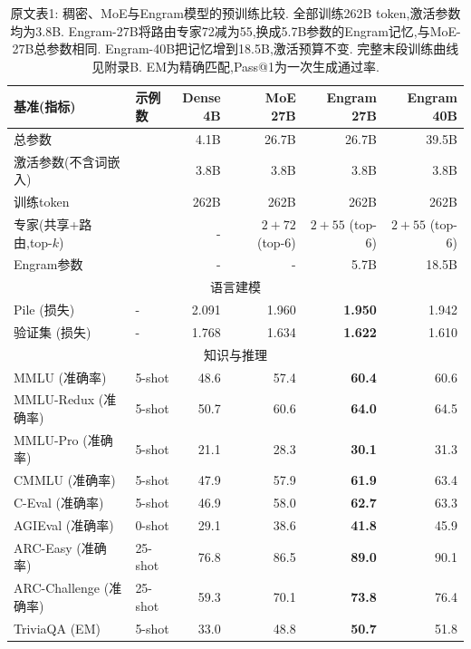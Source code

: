 \begingroup\setlength{\tabcolsep}{3pt}
\begin{longtable}{p{}lrrrr}
\caption{原文表1: 稠密、MoE与Engram模型的预训练比较. 全部训练262B token,激活参数均为3.8B. Engram-27B将路由专家72减为55,换成5.7B参数的Engram记忆,与MoE-27B总参数相同. Engram-40B把记忆增到18.5B,激活预算不变. 完整末段训练曲线见附录B. EM为精确匹配,Pass@1为一次生成通过率.}\label{engram-tab-1}\\
\toprule
 基准(指标) & 示例数 & \shortstack{Dense\\4B} & \shortstack{MoE\\27B} & \shortstack{Engram\\27B} & \shortstack{Engram\\40B} \\
\midrule
 总参数 &  & 4.1B & 26.7B & 26.7B & 39.5B \\
 激活参数(不含词嵌入) &  & 3.8B & 3.8B & 3.8B & 3.8B \\
 训练token &  & 262B & 262B & 262B &  262B \\
 专家(共享+路由,top-$k$) &  & - & $2+72$ (top-6) & $2+55$ (top-6) & $2+55$ (top-6) \\
 Engram参数 &  & - & - & 5.7B & 18.5B \\
 \midrule
\multicolumn{6}{c}{语言建模}\\
Pile {(损失)} & - & 2.091 & 1.960 & \textbf{1.950} & 1.942 \\
 验证集 {(损失)} & - & 1.768 & 1.634 & \textbf{1.622} & 1.610 \\
 \midrule
\multicolumn{6}{c}{知识与推理}\\
MMLU {(准确率)} & 5-shot & 48.6 & 57.4 & \textbf{60.4} &  60.6 \\
 MMLU-Redux {(准确率)} & 5-shot & 50.7 & 60.6 & \textbf{64.0} & 64.5 \\
 MMLU-Pro {(准确率)} & 5-shot & 21.1 & 28.3 & \textbf{30.1} & 31.3  \\
 CMMLU {(准确率)} & 5-shot & 47.9 & 57.9 & \textbf{61.9} &  63.4 \\
 C-Eval {(准确率)} & 5-shot & 46.9 & 58.0 & \textbf{62.7} & 63.3 \\
 AGIEval {(准确率)} & 0-shot & 29.1 & 38.6 & \textbf{41.8} & 45.9 \\
 ARC-Easy {(准确率)} & 25-shot & 76.8 & 86.5 & \textbf{89.0} & 90.1 \\
 ARC-Challenge {(准确率)} & 25-shot & 59.3 & 70.1 & \textbf{73.8} &  76.4 \\
 TriviaQA {(EM)} & 5-shot & 33.0 & 48.8 & \textbf{50.7} & 51.8 \\

\end{longtable}
